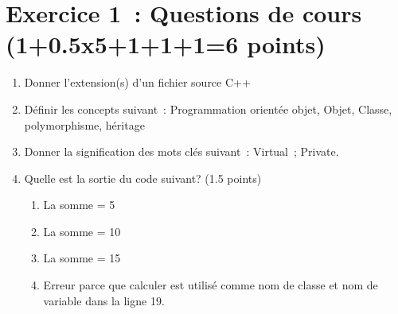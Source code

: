 \section*{Exercice 1 : Questions de cours \scriptsize{(1+0.5x5+1+1+1=6 points})}

\begin{enumerate}

    \item Donner l’extension(s) d'un fichier source C++
    \item  Définir les concepts suivant : Programmation orientée objet, Objet, Classe, polymorphisme, héritage
    \item  Donner la signification des mots clés suivant :  Virtual ; Private.
    \item  Quelle est la sortie du code suivant? (1.5 points)

          

          \begin{enumerate}
              \item La somme = 5
              \item La somme = 10
              \item  La somme = 15
              \item Erreur parce que calculer est utilisé comme nom de classe et nom de variable dans la ligne 19.
          \end{enumerate}
\end{enumerate}